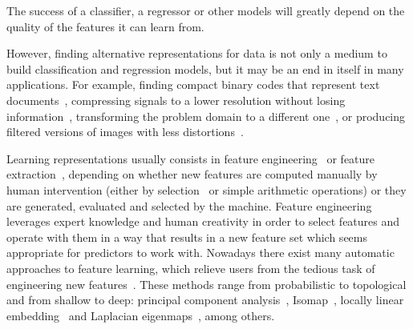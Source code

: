 The success of a classifier, a regressor or other models will greatly depend on the quality of the features it can learn from. 

However, finding alternative representations for data is not only a medium to build classification and regression models, but it may be an end in itself in many applications. For example, finding compact binary codes that represent text documents~, compressing signals to a lower resolution without losing information~, transforming the problem domain to a different one~, or producing filtered versions of images with less distortions~.

Learning representations usually consists in feature engineering~ or feature extraction~, depending on whether new features are computed manually by human intervention (either by selection~ or simple arithmetic operations) or they are generated, evaluated and selected by the machine. Feature engineering leverages expert knowledge and human creativity in order to select features and operate with them in a way that results in a new feature set which seems appropriate for predictors to work with. Nowadays there exist many automatic approaches to feature learning, which relieve users from the tedious task of engineering new features~. These methods range from probabilistic to topological and from shallow to deep: principal component analysis~, Isomap~, locally linear embedding~ and Laplacian eigenmaps~, among others.

